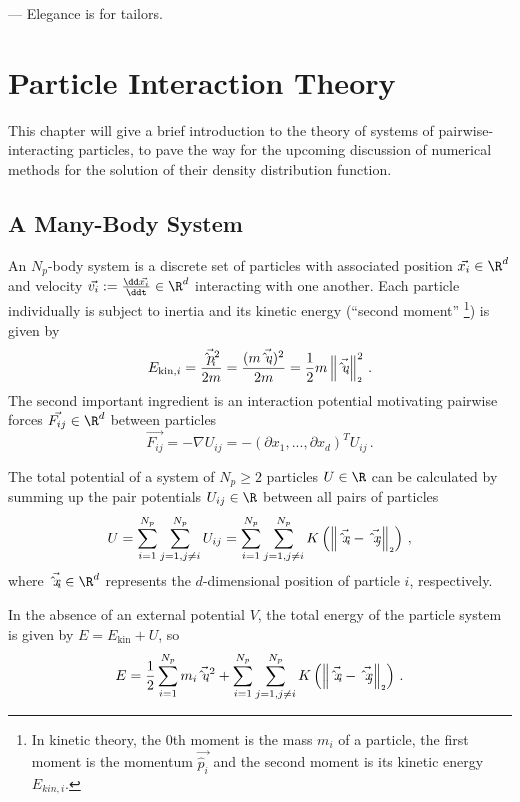 \begin{savequote}[45mm]
  --- Elegance is for tailors.
\end{savequote}

\chapter{Particle Interaction Theory}
\label{chap:particle-interaction-theory}

This chapter will give a brief introduction to the theory of systems of pairwise-interacting particles, to pave the way for the upcoming discussion of numerical methods for the solution of their density distribution function.

\section{A Many-Body System}
An $N_p$-body system is a discrete set of particles with associated position $\vec{x_i} \in \R^d$ and velocity $\vec{v_i} := \frac{\dd\vec{x_i}}{\ddt} \in \R^d$ interacting with one another.
Each particle individually is subject to inertia and its kinetic energy (``second moment'' \footnote{
  In kinetic theory, the $0$th moment is the mass $m_i$ of a particle, the first moment is the momentum $\vec{\hat{p}_i}$ and the second moment is its kinetic energy $E_{kin,i}$.
}) is given by
$$E_{\text{kin},i} = \frac{\vec{\hat{p}_i}^2}{2m} = \frac{(m \vec{\hat{v}_i})^2}{2m} = \frac{1}{2} m \left\lVert\vec{\hat{v}_i}\right\rVert_{\scriptscriptstyle 2}^2\,.$$
The second important ingredient is an interaction potential motivating pairwise forces $\vec{F_{ij}} \in \R^d$ between particles
$$\vec{F_{ij}} = -\nabla U_{ij} = -\left(\partial x_1, ..., \partial x_d\right)^T U_{ij}\,.$$

The total potential of a system of $N_p \ge 2$ particles $U \in \R$ can be calculated by summing up the pair potentials $U_{ij} \in \R$ between all pairs of particles
$$U = \sum_{i=1}^{N_p}\sum_{j=1, j \neq i}^{N_p} U_{ij} = \sum_{i=1}^{N_p}\sum_{j=1, j \neq i}^{N_p} K\left(\left\lVert\vec{\hat{x}_i} - \vec{\hat{x}_j}\right\rVert_{\scriptscriptstyle 2}\right)\,,$$
where $\vec{\hat{x}_i} \in \R^d$ represents the $d$-dimensional position of particle $i$, respectively.

In the absence of an external potential $V$, the total energy of the particle system is given by $E = E_{\text{kin}} + U$, so
\begin{equation}
  E = \frac{1}{2} \sum_{i=1}^{N_p} m_i \vec{\hat{v}_i}^2 + \sum_{i=1}^{N_p}\sum_{j=1, j \neq i}^{N_p} K\left(\left\lVert\vec{\hat{x}_i} - \vec{\hat{x}_j}\right\rVert_{\scriptscriptstyle 2}\right)\,.
  \label{eq:total-energy}
\end{equation}

